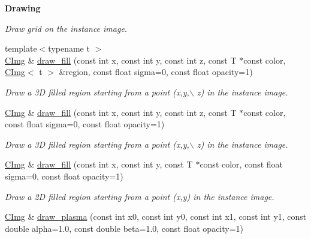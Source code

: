 \begin{Indent}{\bf Drawing}
\begin{DoxyCompactItemize}
\begin{DoxyCompactList}\small\item\em Draw grid on the instance image. \item\end{DoxyCompactList}\item 
{\footnotesize template$<$typename t $>$ }\\\hyperlink{structcimg__library_1_1_c_img}{CImg} \& \hyperlink{structcimg__library_1_1_c_img_af0cae853a65c947dbd93ed0ba06a38bd}{draw\_\-fill} (const int x, const int y, const int z, const T $\ast$const color, \hyperlink{structcimg__library_1_1_c_img}{CImg}$<$ t $>$ \&region, const float sigma=0, const float opacity=1)
\begin{DoxyCompactList}\small\item\em Draw a 3D filled region starting from a point ({\ttfamily x},{\ttfamily y},$\backslash$ z) in the instance image. \item\end{DoxyCompactList}\item 
\hyperlink{structcimg__library_1_1_c_img}{CImg} \& \hyperlink{structcimg__library_1_1_c_img_a86422d29858cca05af9251a37604cd6d}{draw\_\-fill} (const int x, const int y, const int z, const T $\ast$const color, const float sigma=0, const float opacity=1)
\begin{DoxyCompactList}\small\item\em Draw a 3D filled region starting from a point ({\ttfamily x},{\ttfamily y},$\backslash$ z) in the instance image. \item\end{DoxyCompactList}\item 
\hyperlink{structcimg__library_1_1_c_img}{CImg} \& \hyperlink{structcimg__library_1_1_c_img_a13300dbfcceff38c38f80e011059c2bc}{draw\_\-fill} (const int x, const int y, const T $\ast$const color, const float sigma=0, const float opacity=1)
\begin{DoxyCompactList}\small\item\em Draw a 2D filled region starting from a point ({\ttfamily x},{\ttfamily y}) in the instance image. \item\end{DoxyCompactList}\item 
\hyperlink{structcimg__library_1_1_c_img}{CImg} \& \hyperlink{structcimg__library_1_1_c_img_a295192935c48e4c27a35dfa66579398b}{draw\_\-plasma} (const int x0, const int y0, const int x1, const int y1, const double alpha=1.0, const double beta=1.0, const float opacity=1)

\end{DoxyCompactItemize}
\end{Indent}
